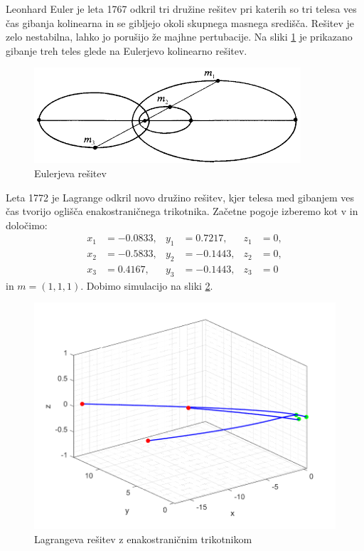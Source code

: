 \documentclass[a4paper,12pt]{article}
\begin{document}
Leonhard Euler je leta 1767 odkril tri družine rešitev pri katerih so tri telesa ves čas gibanja kolinearna
in se gibljejo okoli skupnega masnega središča.
Rešitev je zelo nestabilna, lahko jo porušijo že majhne pertubacije.
Na sliki \ref{Euler} je prikazano gibanje treh teles glede na Eulerjevo kolinearno rešitev.
\begin{figure}[H]
    \centering
    \includegraphics[width=\textwidth]{figures/euler_slika.png}
    \caption{Eulerjeva rešitev}
    \label{Euler}
\end{figure}

Leta 1772 je Lagrange odkril novo družino rešitev, kjer telesa med gibanjem ves čas tvorijo
oglišča enakostraničnega trikotnika.
Začetne pogoje izberemo kot v \cite{James} in določimo:
\begin{align*}
    x_1 &=-0.0833, & y_1&= 0.7217, & z_1 &=0, \\
    x_2 &= -0.5833, & y_2 &= -0.1443, & z_2 &=0, \\
    x_3&=0.4167, & y_3&=-0.1443, &  z_3&=0
\end{align*}
in $m = (1,1,1)$. Dobimo simulacijo na sliki \ref{Lagrange}.
\begin{figure}[H]
    \centering
    \includegraphics[width=\textwidth]{figures/Lagrange.png}
    \caption{Lagrangeva rešitev z enakostraničnim trikotnikom}
    \label{Lagrange}
\end{figure}
\end{document}
